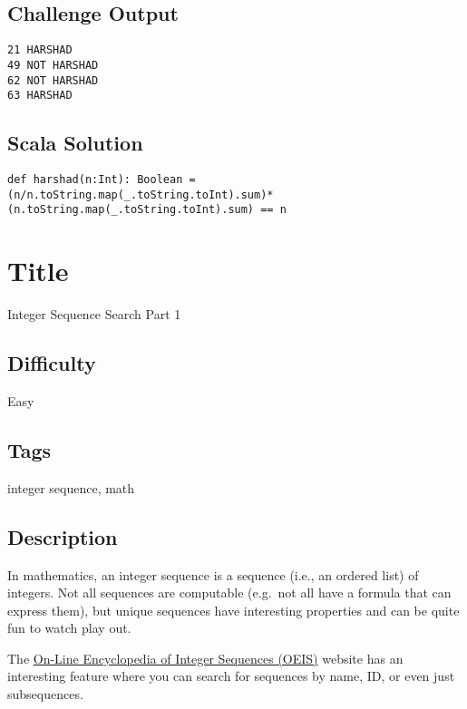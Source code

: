 \subsection{Challenge Output}\label{challenge-output-18}

\begin{verbatim}
21 HARSHAD 
49 NOT HARSHAD
62 NOT HARSHAD
63 HARSHAD
\end{verbatim}

\subsection{Scala Solution}\label{scala-solution-17}

\begin{verbatim}
def harshad(n:Int): Boolean = (n/n.toString.map(_.toString.toInt).sum)*(n.toString.map(_.toString.toInt).sum) == n
\end{verbatim}

\section{Title}\label{title-28}

Integer Sequence Search Part 1

\subsection{Difficulty}\label{difficulty-27}

Easy

\subsection{Tags}\label{tags-28}

integer sequence, math

\subsection{Description}\label{description-28}

In mathematics, an integer sequence is a sequence (i.e., an ordered
list) of integers. Not all sequences are computable (e.g.~not all have a
formula that can express them), but unique sequences have interesting
properties and can be quite fun to watch play out.

The \href{https://oeis.org/}{On-Line Encyclopedia of Integer Sequences
(OEIS)} website has an interesting feature where you can search for
sequences by name, ID, or even just subsequences.

